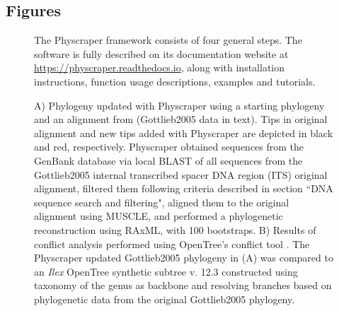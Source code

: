 \documentclass{bmcart}
\begin{document}
\begin{backmatter}
\section*{Figures}
  \begin{figure}[h!]
  \caption{The Physcraper framework consists of four general steps. The software is fully
  described on its documentation website at \href{https://physcraper.readthedocs.io}{https://physcraper.readthedocs.io},
  along with installation instructions, function usage descriptions, examples and tutorials.
}
\end{figure}

\begin{figure}[h!]
  \caption{A) Phylogeny updated with Physcraper using a starting phylogeny and an alignment from
  \cite{gottlieb2005molecular} (Gottlieb2005 data in text).
  Tips in original alignment and new tips added with Physcraper are depicted in
  black and red, respectively. Physcraper obtained sequences from the GenBank
  database via local BLAST of all sequences from the Gottlieb2005 internal transcribed
  spacer DNA region (ITS) original alignment,
  filtered them following criteria described in section ``DNA sequence search and
  filtering", aligned them to the original alignment using MUSCLE, and performed a
  phylogenetic reconstruction using RAxML, with 100 bootstraps. B) Results of conflict
  analysis performed using OpenTree's conflict tool \cite{redelings2017supertree}.
  The Physcraper updated Gottlieb2005 phylogeny in (A) was compared to an \textit{Ilex}
  OpenTree synthetic subtree v. 12.3 \cite{ott727571} constructed using taxonomy of the genus
  as backbone and resolving branches based on phylogenetic data from the original
  Gottlieb2005 phylogeny.
}
\end{figure}


\end{backmatter}
\end{document}

